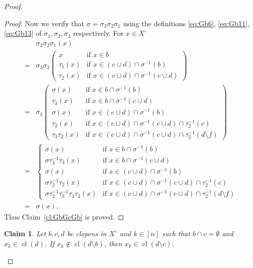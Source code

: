 \documentclass[12pt,a4paper,reqno]{amsart}
\numberwithin{equation}{section}
\theoremstyle{plain}
\newtheorem{claim}[thm]{Claim}
\theoremstyle{definition}
\newcommand*{\proofclaimname}{Proof}
\newenvironment{proofclaim}[1][\proofclaimname]{\begin{proof}[#1]\renewcommand*{\qedsymbol}{\(\diamond\)}}{\end{proof}}
\DeclareMathOperator{\cl}{cl}
\begin{document}
\begin{proof}
\begin{proofclaim}
 Now we verify that $\sigma=\sigma_3\sigma_2\sigma_1$ using the definitions \eqref{eq:Gb6}, \eqref{eq:Gb11}, \eqref{eq:Gb13}
 of $\sigma_1,\sigma_2,\sigma_3$ respectively.
 For $x\in X^\circ$
 \begin{align*}
 &\sigma_3\sigma_2\sigma_1(x)
 \\
 =&
 \sigma_3\sigma_2\left( 
 \begin{array}{ll}
 x & \text{if } x\in b\\
 \tau_1(x) & \text{if } x\in (c\cup d)\cap \sigma^{-1}(b)\\
 \tau_2(x) & \text{if } x\in (c\cup d)\cap \sigma^{-1}(c\cup d)
 \end{array}
 \right)
 \\
 =&
 \sigma_3\left(\begin{array}{ll}
 \sigma(x) & \text{if } x\in b\cap \sigma^{-1}(b)\\
 \tau_3(x) & \text{if } x\in b\cap \sigma^{-1}(c\cup d)\\
 \sigma(x) & \text{if } x\in (c\cup d)\cap \sigma^{-1}(b)\\
 \tau_2(x) & \text{if } x\in (c\cup d)\cap \sigma^{-1}(c\cup d) \cap \tau_2^{-1}(c)\\
 \tau_3\tau_2(x) &\text{if } x\in (c\cup d)\cap \sigma^{-1}(c\cup d)\cap \tau_2^{-1}(d\setminus f)
 \end{array}\right)
 \\
 =&
 \begin{cases}
 \sigma(x) & \text{if } x\in b\cap \sigma^{-1}(b)\\
 \sigma\tau_3^{-1}\tau_3(x) & \text{if } x\in b\cap \sigma^{-1}(c\cup d)\\
 \sigma(x) & \text{if } x\in (c\cup d)\cap \sigma^{-1}(b)\\
 \sigma\tau_2^{-1}\tau_2(x) & \text{if } x\in (c\cup d)\cap \sigma^{-1}(c\cup d)\cap \tau_2^{-1}(c)\\
 \sigma\tau_2^{-1}\tau_3^{-1}\tau_3\tau_2(x) & \text{if } 
 x\in (c\cup d)\cap \sigma^{-1}(c\cup d)\cap \tau_2^{-1}(d\setminus f)
 \end{cases}
 \\
 =& \sigma(x).
 \end{align*}
Thus Claim~\ref{cl:GbGcGb} is proved.
\end{proofclaim}



\begin{claim} \label{cl:abutone}
  Let $b,c,d$ be clopens in $X^\circ$ and $k\in [n]$ such that $b\cap c=\emptyset$ and $x_k\in\cl(d)$.
  If $x_k\not\in \cl(d\setminus b)$, then $x_k\in\cl(d\setminus c)$.
\end{claim}


\end{proof}
\end{document}
